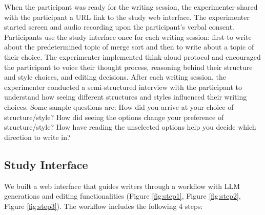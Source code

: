 When the participant was ready for the writing session, the experimenter shared with the participant a URL link to the study web interface. The experimenter started screen and audio recording upon the participant's verbal consent. Participants use the study interface once for each writing session: first to write about the predetermined topic of merge sort and then to write about a topic of their choice. The experimenter implemented think-aloud protocol and encouraged the participant to voice their thought process, reasoning behind their structure and style choices, and editing decisions. After each writing session, the experimenter conducted a semi-structured interview with the participant to understand how seeing different structures and styles influenced their writing choices. Some sample questions are: 
How did you arrive at your choice of structure/style?
How did seeing the options change your preference of structure/style?
How have reading the unselected options help you decide which direction to write in?





\subsection{Study Interface}
\label{sec:writer_workflow}

We built a web interface that guides writers through a workflow with LLM generations and editing functionalities (Figure \ref{fig:step1}, Figure \ref{fig:step2}, Figure \ref{fig:step3}). The workflow includes the following 4 steps:

